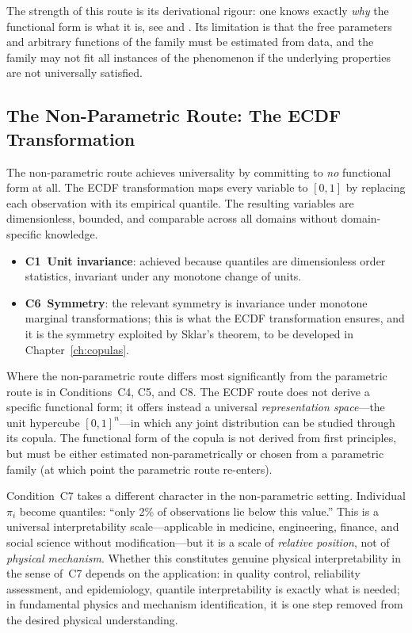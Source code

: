 \medskip\noindent
The strength of this route is its derivational rigour: one knows
exactly \emph{why} the functional form is what it is, see \cite{krantz1971foundations} and \cite{Narens2007}.  Its
limitation is that the free parameters and arbitrary functions of the family must be
estimated from data, and the family may not fit all instances of
the phenomenon if the underlying properties are not universally
satisfied.

\subsection{The Non-Parametric Route: The ECDF Transformation}
\label{ssec:ucq:nonparametric}

The non-parametric route achieves universality by committing to
\emph{no} functional form at all.  The ECDF transformation maps
every variable to $[0,1]$ by replacing each observation with its
empirical quantile.  The resulting variables are dimensionless,
bounded, and comparable across all domains without domain-specific
knowledge.

\begin{itemize}[leftmargin=2.5em]
  \item \textbf{C1~Unit invariance}: achieved because quantiles are
    dimensionless order statistics, invariant under any monotone
    change of units.
  \item \textbf{C6~Symmetry}: the relevant symmetry is invariance
    under monotone marginal transformations; this is what the ECDF
    transformation ensures, and it is the symmetry exploited by
    Sklar's theorem, to be developed in
    Chapter~\ref{ch:copulas}.
\end{itemize}

\medskip\noindent
Where the non-parametric route differs most significantly from the
parametric route is in Conditions~C4, C5, and C8.  The ECDF route
does not derive a specific functional form; it offers instead a
universal \emph{representation space}---the unit hypercube
$[0,1]^n$---in which any joint distribution can be studied through
its copula.  The functional form of the copula is not derived from
first principles, but must be either estimated non-parametrically
or chosen from a parametric family (at which point the parametric
route re-enters).

Condition~C7 takes a different character in the non-parametric
setting.  Individual $\pi_i$ become quantiles: ``only 2\% of
observations lie below this value.''  This is a universal
interpretability scale---applicable in medicine, engineering,
finance, and social science without modification---but it is a
scale of \emph{relative position}, not of \emph{physical
mechanism}.  Whether this constitutes genuine physical
interpretability in the sense of~C7 depends on the application:
in quality control, reliability assessment, and epidemiology,
quantile interpretability is exactly what is needed; in
fundamental physics and mechanism identification, it is one step
removed from the desired physical understanding.

